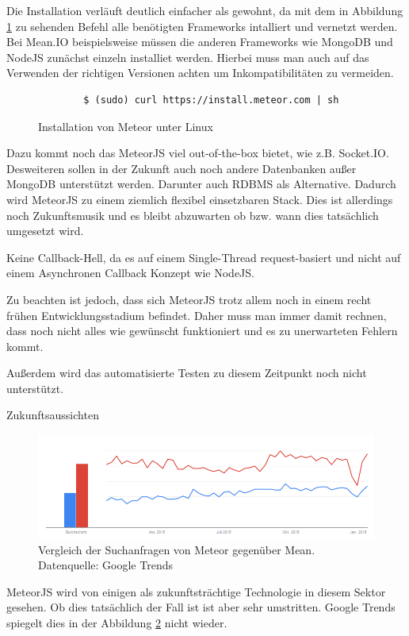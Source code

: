 Die Installation verläuft deutlich einfacher als gewohnt, da mit dem in Abbildung \ref{f:instMeteor} zu sehenden Befehl alle benötigten Frameworks intalliert und vernetzt werden. Bei Mean.IO beispielsweise müssen die anderen Frameworks wie MongoDB und NodeJS zunächst einzeln installiet werden. Hierbei muss man auch auf das Verwenden der richtigen Versionen achten um Inkompatibilitäten zu vermeiden.

\begin{figure}[h]
	\centering
	\begin{lstlisting}
		$ (sudo) curl https://install.meteor.com | sh
	\end{lstlisting}
	\caption[instMeteor]{Installation von Meteor unter Linux \cite{meteor:t3n}}
	\label{f:instMeteor}
\end{figure}
	
Dazu kommt noch das MeteorJS viel out-of-the-box bietet, wie z.B. Socket.IO. Desweiteren sollen in der Zukunft auch noch andere Datenbanken außer MongoDB unterstützt werden. Darunter auch RDBMS als Alternative. Dadurch wird MeteorJS zu einem ziemlich flexibel einsetzbaren Stack. Dies ist allerdings noch Zukunftsmusik und es bleibt abzuwarten ob bzw. wann dies tatsächlich umgesetzt wird.
	
Keine Callback-Hell, da es auf einem Single-Thread request-basiert und nicht auf einem Asynchronen Callback Konzept wie NodeJS.
	
Zu beachten ist jedoch, dass sich MeteorJS trotz allem noch in einem recht frühen Entwicklungsstadium befindet. Daher muss man immer damit rechnen, dass noch nicht alles wie gewünscht funktioniert und es zu unerwarteten Fehlern kommt.
	
Außerdem wird das automatisierte Testen zu diesem Zeitpunkt noch nicht unterstützt.

Zukunftsaussichten

\begin{figure}[h]
	\centering
	\includegraphics[width=0.7\linewidth]{figures/meteor-vs-mean.png}
	\caption{Vergleich der Suchanfragen von Meteor gegenüber Mean. Datenquelle: Google Trends \cite{googleTrends:meteorVsMean}}
	\label{f:mean-frameworks:meteorVsMean}
\end{figure}

MeteorJS wird von einigen als zukunftsträchtige Technologie in diesem Sektor gesehen.
Ob dies tatsächlich der Fall ist ist aber sehr umstritten.
Google Trends spiegelt dies in der Abbildung \ref{f:mean-frameworks:meteorVsMean} nicht wieder.
